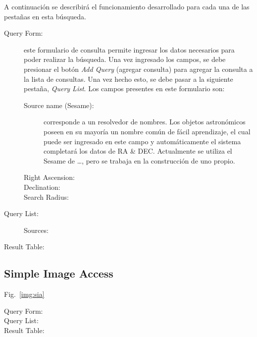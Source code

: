 A continuación se describirá el funcionamiento desarrollado para cada
una de las pestañas en esta búsqueda.

\begin{description}
  \item [Query Form:] este formulario de consulta permite ingresar los
    datos necesarios para poder realizar la búsqueda. Una vez
    ingresado los campos, se debe presionar el botón \emph{Add Query}
    (agregar consulta) para agregar la consulta a la lista de
    consultas. Una vez hecho esto, se debe pasar a la siguiente
    pestaña, \emph{Query List}. Los campos presentes en este
    formulario son:
    \begin{description}
      \item [Source name (Sesame):] corresponde a un resolvedor de
	nombres. Los objetos astronómicos poseen en su mayoría un
	nombre común de fácil aprendizaje, el cual puede ser ingresado
	en este campo y automáticamente el sistema completará los
	datos de RA \& DEC. Actualmente se utiliza el Sesame de
	{\ldots}, pero se trabaja en la construcción de uno propio.
      \item [Right Ascension:]
      \item [Declination:]
      \item [Search Radius:]
    \end{description}
  \item [Query List:]
    \begin{description}
      \item [Sources:]
    \end{description}  
  \item [Result Table:]
\end{description}  

\subsection{Simple Image Access}

Fig.~\ref{img:sia}

\begin{description}
  \item [Query Form:]
  \item [Query List:]
  \item [Result Table:]
\end{description}  

